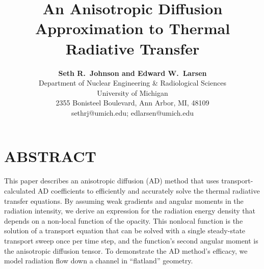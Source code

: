 \documentclass[11pt,letter,twoside]{mc2011}
\begin{document}
\title{An Anisotropic Diffusion Approximation to Thermal Radiative
Transfer}

\author{
\textbf{Seth R.~Johnson and Edward W.~Larsen}\\
Department of Nuclear Engineering \& Radiological Sciences\\
University of Michigan \\
2355 Bonisteel Boulevard, Ann Arbor, MI, 48109\\
sethrj@umich.edu; edlarsen@umich.edu
}

\maketitle

\thispagestyle{empty}

\section*{ABSTRACT}

\small

This paper describes an anisotropic diffusion (AD) method that uses
transport-calculated AD coefficients to efficiently and accurately solve the
thermal radiative transfer equations. By assuming weak gradients and angular moments in the radiation
intensity, we derive an expression for the radiation energy density that
depends on a non-local function of the opacity. This nonlocal function is the
solution of a transport equation that can be solved with a single steady-state
transport sweep once per time step, and the function's second angular moment is
the anisotropic diffusion tensor.
To demonstrate the AD method's efficacy, we model radiation flow down a channel 
in ``flatland'' geometry. 

\end{document}
